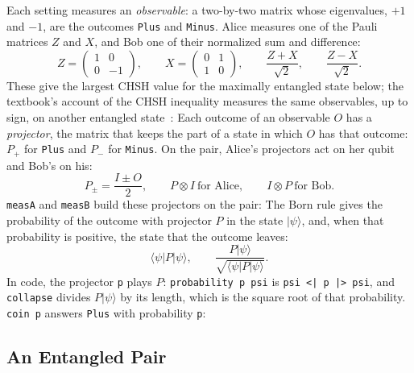 \documentclass[11pt]{article}
\newcommand{\hs}{\lstinline[style=hask,basicstyle=\ttfamily,frame=none]}
\begin{document}
Each setting measures an \emph{observable}: a two-by-two matrix whose eigenvalues, $+1$ and $-1$, are the outcomes \hs|Plus| and \hs|Minus|. Alice measures one of the Pauli matrices $Z$ and $X$, and Bob one of their normalized sum and difference:
\[
  Z = \begin{pmatrix} 1 & 0 \\ 0 & -1 \end{pmatrix}, \qquad
  X = \begin{pmatrix} 0 & 1 \\ 1 & 0 \end{pmatrix}, \qquad
  \frac{Z + X}{\sqrt2}, \qquad \frac{Z - X}{\sqrt2}.
\]
These give the largest CHSH value for the maximally entangled state below; the textbook's account of the CHSH inequality measures the same observables, up to sign, on another entangled state~\citep[Section~2.6]{NielsenChuang2010}:
Each outcome of an observable $O$ has a \emph{projector}, the matrix that keeps the part of a state in which $O$ has that outcome: $P_{+}$ for \hs|Plus| and $P_{-}$ for \hs|Minus|. On the pair, Alice's projectors act on her qubit and Bob's on his:
\[
  P_{\pm} = \frac{I \pm O}{2}, \qquad
  P \otimes I \ \text{for Alice}, \qquad I \otimes P \ \text{for Bob}.
\]
\hs|measA| and \hs|measB| build these projectors on the pair:
The Born rule gives the probability of the outcome with projector $P$ in the state $|\psi\rangle$, and, when that probability is positive, the state that the outcome leaves:
\[
  \langle\psi|P|\psi\rangle, \qquad
  \frac{P|\psi\rangle}{\sqrt{\langle\psi|P|\psi\rangle}}.
\]
In code, the projector \hs|p| plays $P$: \hs|probability p psi| is \hs!psi <| p |> psi!, and \hs|collapse| divides $P|\psi\rangle$ by its length, which is the square root of that probability. \hs|coin p| answers \hs|Plus| with probability \hs|p|:

\subsection{An Entangled Pair}\label{sec:pair}
\end{document}
